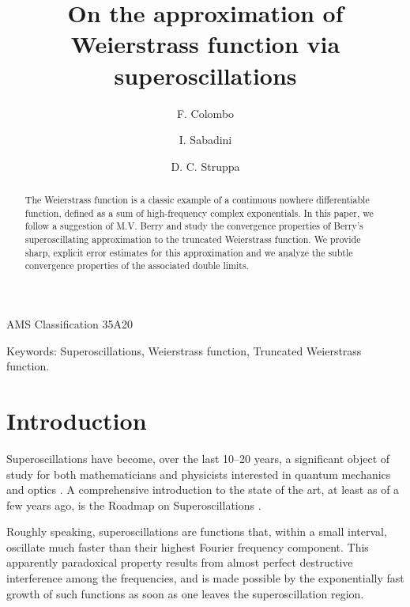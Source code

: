 \documentclass[reqno,11pt]{amsart}
\title{On the approximation of Weierstrass function via superoscillations}
\author[F. Colombo]{F. Colombo}
\author[I. Sabadini]{I. Sabadini}
\author[D. C. Struppa]{D. C. Struppa}
\theoremstyle{definition}
\begin{document}
\maketitle

\begin{abstract}
The Weierstrass function is a classic example of a continuous nowhere differentiable function, defined as a sum of high-frequency complex exponentials. In this paper, we follow a suggestion of M.V. Berry and study the convergence properties of Berry's superoscillating approximation to the truncated Weierstrass function. We provide sharp, explicit error estimates for this approximation and we analyze the subtle convergence properties of the associated double limits.
\end{abstract}

\medskip
AMS Classification 35A20

\medskip
Keywords: Superoscillations,
Weierstrass function,
Truncated Weierstrass function.

\section{Introduction}



Superoscillations have become, over the last 10--20 years, a significant object of study for both mathematicians \cite{colombo2017,BOREL,Pozzi} and physicists interested in quantum mechanics and optics \cite{AAV, aharonov1990,berry1994,Ahar-bohm-JMP,kempf2,kempf3,jordan,jordan2,kempf4}. A comprehensive introduction to the state of the art, at least as of a few years ago, is the Roadmap on Superoscillations \cite{berry2019roadmap}.

Roughly speaking, superoscillations are functions that, within a small interval, oscillate much faster than their highest Fourier frequency component. This apparently paradoxical property results from almost perfect destructive interference among the frequencies, and is made possible by the exponentially fast growth of such functions as soon as one leaves the superoscillation region.
\end{document}

